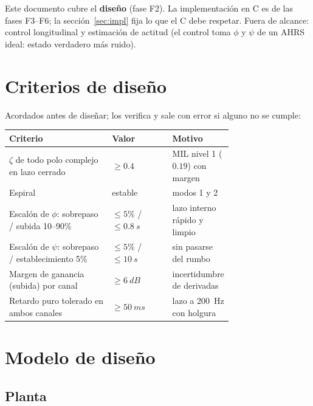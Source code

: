 \documentclass[11pt,a4paper]{article}
\begin{document}
Este documento cubre el \textbf{diseño} (fase F2). La implementación en C es
de las fases F3--F6; la sección~\ref{sec:impl} fija lo que el C debe respetar.
Fuera de alcance: control longitudinal y estimación de actitud (el control
toma $\phi$ y $\psi$ de un AHRS ideal: estado verdadero más ruido).

\section{Criterios de diseño}

Acordados antes de diseñar;  los
verifica y sale con error si alguno no se cumple:

\begin{center}
\small
\begin{tabular}{p{0.46\linewidth}lp{0.27\linewidth}}
\toprule
Criterio & Valor & Motivo \\
\midrule
$\zeta$ de todo polo complejo en lazo cerrado & $\ge 0.4$ & MIL nivel 1 ($0.19$) con margen \\
Espiral & estable & modos 1 y 2 \\
Escalón de $\phi$: sobrepaso / subida 10--90\% & $\le 5\%$ / $\le \SI{0.8}{s}$ & lazo interno rápido y limpio \\
Escalón de $\psi$: sobrepaso / establecimiento 5\% & $\le 5\%$ / $\le \SI{10}{s}$ & sin pasarse del rumbo \\
Margen de ganancia (subida) por canal & $\ge \SI{6}{dB}$ & incertidumbre de derivadas \\
Retardo puro tolerado en ambos canales & $\ge \SI{50}{ms}$ & lazo a \SI{200}{Hz} con holgura \\
\bottomrule
\end{tabular}
\end{center}

\section{Modelo de diseño}

\subsection{Planta}
\end{document}
